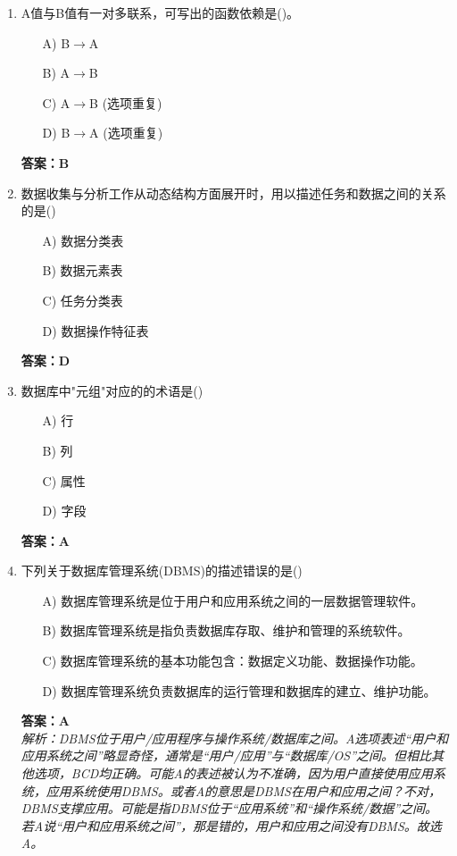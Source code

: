 \documentclass[a4paper,12pt]{article}
\begin{document}
\begin{enumerate}[label=\arabic*.]
\item A值与B值有一对多联系，可写出的函数依赖是()。
\begin{itemize}
    \item[A)] B$\to$A
    \item[B)] A$\to$B
    \item[C)] A$\to$B (选项重复)
    \item[D)] B$\to$A (选项重复)
\end{itemize}
\textbf{答案：B} 

\item 数据收集与分析工作从动态结构方面展开时，用以描述任务和数据之间的关系的是()
\begin{itemize}
    \item[A)] 数据分类表
    \item[B)] 数据元素表
    \item[C)] 任务分类表
    \item[D)] 数据操作特征表
\end{itemize}
\textbf{答案：D}

\item 数据库中"元组"对应的的术语是()
\begin{itemize}
    \item[A)] 行
    \item[B)] 列
    \item[C)] 属性
    \item[D)] 字段
\end{itemize}
\textbf{答案：A}

\item 下列关于数据库管理系统(DBMS)的描述错误的是()
\begin{itemize}
    \item[A)] 数据库管理系统是位于用户和应用系统之间的一层数据管理软件。
    \item[B)] 数据库管理系统是指负责数据库存取、维护和管理的系统软件。
    \item[C)] 数据库管理系统的基本功能包含：数据定义功能、数据操作功能。
    \item[D)] 数据库管理系统负责数据库的运行管理和数据库的建立、维护功能。
\end{itemize}
\textbf{答案：A} \\
\textit{解析：DBMS位于用户/应用程序与操作系统/数据库之间。A选项表述“用户和应用系统之间”略显奇怪，通常是“用户/应用”与“数据库/OS”之间。但相比其他选项，BCD均正确。可能A的表述被认为不准确，因为用户直接使用应用系统，应用系统使用DBMS。或者A的意思是DBMS在用户和应用之间？不对，DBMS支撑应用。可能是指DBMS位于“应用系统”和“操作系统/数据”之间。若A说“用户和应用系统之间”，那是错的，用户和应用之间没有DBMS。故选A。}


\end{enumerate}
\end{document}
